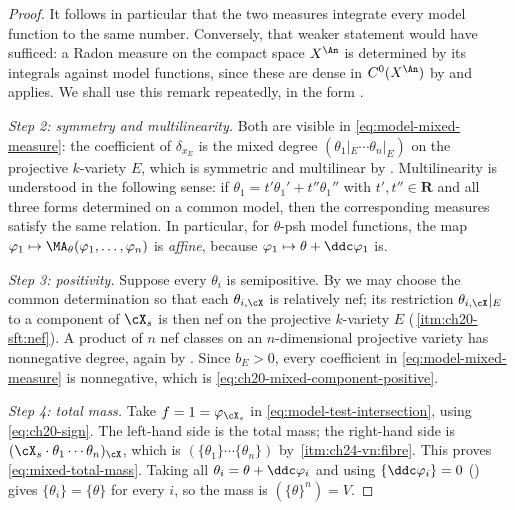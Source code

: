 \begin{proof}
It follows in particular that the two measures integrate every model
function to the same number.  Conversely, that weaker statement would have
sufficed: a Radon measure on the compact space \(X^{\An}\) is determined by
its integrals against model functions, since these are dense in
\(C^0(X^{\An})\) by  and
 applies.  We shall use this remark repeatedly,
in the form .

\emph{Step 2: symmetry and multilinearity.}  Both are visible in
\eqref{eq:model-mixed-measure}: the coefficient of \(\delta_{x_E}\) is the
mixed degree \((\theta_{1}|_E\cdots\theta_{n}|_E)\) on the projective
\(k\)-variety \(E\), which is symmetric and multilinear by
.  Multilinearity is understood in the
following sense: if \(\theta_1=t'\theta_1'+t''\theta_1''\) with
\(t',t''\in\mathbf R\) and all three forms determined on a common model,
then the corresponding measures satisfy the same relation.  In particular,
for \(\theta\)-psh model functions, the map
\(\varphi_1\mapsto\MA_\theta(\varphi_1,\ldots,\varphi_n)\) is \emph{affine},
because \(\varphi_1\mapsto\theta+\ddc\varphi_1\) is.

\emph{Step 3: positivity.}  Suppose every \(\theta_i\) is semipositive.  By
 we may choose the common
determination so that each \(\theta_{i,\cX}\) is relatively nef; its
restriction \(\theta_{i,\cX}|_E\) to a component of \(\cX_s\) is then nef on
the projective \(k\)-variety \(E\)
(\,\cref{itm:ch20-sft:nef}).  A product of
\(n\) nef classes on an \(n\)-dimensional projective variety has nonnegative
degree, again by .  Since \(b_E>0\), every
coefficient in \eqref{eq:model-mixed-measure} is nonnegative, which is
\eqref{eq:ch20-mixed-component-positive}.

\emph{Step 4: total mass.}  Take \(f=1=\varphi_{\cX_s}\) in
\eqref{eq:model-test-intersection}, using \eqref{eq:ch20-sign}.  The
left-hand side is the total mass; the right-hand side is
\((\cX_s\cdot\theta_1\cdots\theta_n)_{\cX}\), which is
\((\{\theta_1\}\cdots\{\theta_n\})\) by
\,\cref{itm:ch24-vn:fibre}.  This proves
\eqref{eq:mixed-total-mass}.  Taking all \(\theta_i=\theta+\ddc\varphi_i\)
and using \(\{\ddc\varphi_i\}=0\) () gives
\(\{\theta_i\}=\{\theta\}\) for every \(i\), so the mass is
\((\{\theta\}^n)=V\).
\end{proof}

